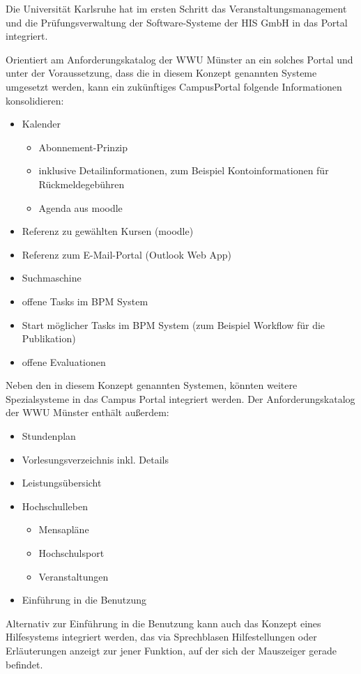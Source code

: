 Die Universität Karlsruhe hat im ersten Schritt das Veranstaltungsmanagement und die Prüfungsverwaltung der Software-Systeme der HIS GmbH in das Portal integriert.

Orientiert am Anforderungskatalog der WWU Münster an ein solches Portal und unter der Voraussetzung, dass die in diesem Konzept genannten Systeme umgesetzt werden, kann ein zukünftiges CampusPortal folgende Informationen konsolidieren:

\begin{itemize}
	\item Kalender
	\begin{itemize}
		\item Abonnement-Prinzip
		\item inklusive Detailinformationen, zum Beispiel Kontoinformationen für Rückmeldegebühren
		\item Agenda aus moodle
	\end{itemize}
	\item Referenz zu gewählten Kursen (moodle)
	\item Referenz zum E-Mail-Portal (Outlook Web App)
	\item Suchmaschine
	\item offene Tasks im BPM System
	\item Start möglicher Tasks im BPM System (zum Beispiel Workflow für die Publikation)
	\item offene Evaluationen
\end{itemize}

Neben den in diesem Konzept genannten Systemen, könnten weitere Spezialsysteme in das Campus Portal integriert werden. Der Anforderungskatalog der WWU Münster enthält außerdem:

\begin{itemize}
	\item Stundenplan
	\item Vorlesungsverzeichnis inkl. Details
	\item Leistungsübersicht
	\item Hochschulleben
	\begin{itemize}
		\item Mensapläne
		\item Hochschulsport
		\item Veranstaltungen
	\end{itemize}
	\item Einführung in die Benutzung
\end{itemize}

Alternativ zur Einführung in die Benutzung kann auch das Konzept eines Hilfesystems integriert werden, das via Sprechblasen Hilfestellungen oder Erläuterungen anzeigt zur jener Funktion, auf der sich der Mauszeiger gerade befindet.


